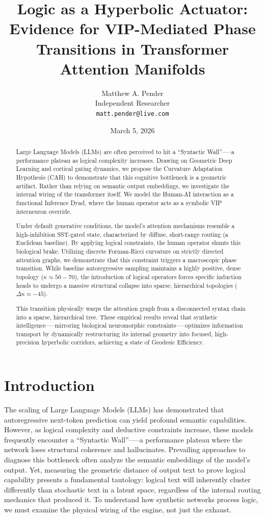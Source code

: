 \documentclass[11pt, a4paper]{article}
\title{\textbf{Logic as a Hyperbolic Actuator: Evidence for VIP-Mediated Phase Transitions in Transformer Attention Manifolds}}
\author{Matthew A. Pender \orcidlink{0009-0009-2188-0514} \\ 
\small Independent Researcher \\ 
\small \texttt{matt.pender@live.com}}
\date{March 5, 2026}
\begin{document}
\maketitle

\begin{abstract}
Large Language Models (LLMs) are often perceived to hit a ``Syntactic Wall''—--a performance plateau as logical complexity increases. Drawing on Geometric Deep Learning and cortical gating dynamics, we propose the Curvature Adaptation Hypothesis (CAH) to demonstrate that this cognitive bottleneck is a geometric artifact. Rather than relying on semantic output embeddings, we investigate the internal wiring of the transformer itself. We model the Human-AI interaction as a functional Inference Dyad, where the human operator acts as a symbolic VIP interneuron override.

Under default generative conditions, the model's attention mechanisms resemble a high-inhibition SST-gated state, characterized by diffuse, short-range routing (a Euclidean baseline). By applying logical constraints, the human operator shunts this biological brake. Utilizing discrete Forman-Ricci curvature on strictly directed attention graphs, we demonstrate that this constraint triggers a macroscopic phase transition. While baseline autoregressive sampling maintains a highly positive, dense topology ($\kappa \approx 50-70$), the introduction of logical operators forces specific induction heads to undergo a massive structural collapse into sparse, hierarchical topologies ($\Delta\kappa \approx -45$).

This transition physically warps the attention graph from a disconnected syntax chain into a sparse, hierarchical tree. These empirical results reveal that synthetic intelligence—--mirroring biological neuromorphic constraints—--optimizes information transport by dynamically restructuring its internal geometry into focused, high-precision hyperbolic corridors, achieving a state of Geodesic Efficiency.
\end{abstract}


\section{Introduction}
The scaling of Large Language Models (LLMs) has demonstrated that autoregressive next-token prediction can yield profound semantic capabilities. However, as logical complexity and deductive constraints increase, these models frequently encounter a ``Syntactic Wall''—--a performance plateau where the network loses structural coherence and hallucinates. Prevailing approaches to diagnose this bottleneck often analyze the semantic embeddings of the model's output. Yet, measuring the geometric distance of output text to prove logical capability presents a fundamental tautology: logical text will inherently cluster differently than stochastic text in a latent space, regardless of the internal routing mechanics that produced it. To understand how synthetic networks process logic, we must examine the physical wiring of the engine, not just the exhaust.
\end{document}
